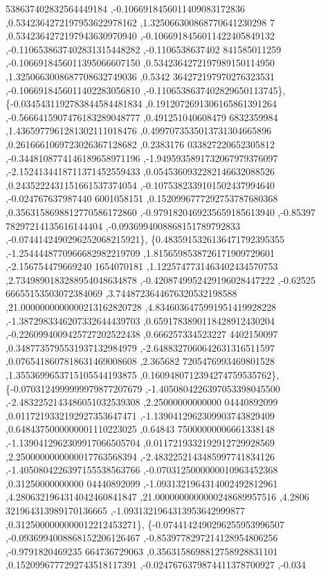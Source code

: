 \begin{DoxyCode}
      538637402832564449184 ,-0.1066918456011409083172836 ,0.5342364272197953622978162 ,1.325066300868770641230298
      7 ,0.5342364272197943630970940 ,-0.1066918456011422405849132 ,-0.1106538637402831315448282 ,-0.1106538637402
      841585011259 ,-0.1066918456011395066607150 ,0.5342364272197989150114950 ,1.3250663008687708632749036 ,0.5342
      364272197970276323531 ,-0.1066918456011402283056810 ,-0.1106538637402829650113745\},
\{-0.0345431192783844584481834 ,0.1912072691306165861391264 ,-0.5666415907476183289048777 ,0.491251040608479
      6832359984 ,1.4365977961281302111018476 ,0.4997073535013731304665896 ,0.2616661069723026367128682 ,0.2383176
      033827220652305812 ,-0.3448108774146189658971196 ,-1.9495935891732067979376097 ,-2.1524134418711371452559433
       ,0.0545360932282146632088526 ,0.2435222431151661537374054 ,-0.1075382339101502437994640 ,-0.024767637987440
      6001058151 ,0.1520996777292753787680368 ,0.3563158698812770586172860 ,-0.9791820469235659185613940 ,-0.85397
      78297214135616144404 ,-0.0936994008868151789792833 ,-0.0744142490296252068215921\},
\{0.4835915326136471792395355 ,-1.2544448770966682982219709 ,1.8156598538726171909729601 ,-2.156754479669240
      1654070181 ,1.1225747731463402434570753 ,2.7349890183288954048634878 ,-0.4208749952429196028447222 ,-0.62525
      66655153503072384069 ,3.7448723644676320532198588 ,21.0000000000000213162820728 ,4.8346036475991951419928228
       ,-1.3872983346207332644439703 ,0.6591783890118428912430204 ,-0.2260994009425727202522438 ,0.666257334523227
      4402150097 ,0.3487735795531937132984979 ,-2.6488327060642631316511597 ,0.0765418607818631469008608 ,2.365682
      7205476993469801528 ,1.3553699653715105544193875 ,0.1609480712394274759535762\},
\{-0.0703124999999979877207679 ,-1.4050804226397053398045500 ,-2.4832252143486051032539308 ,2.25000000000000
      04440892099 ,0.0117219332192927353647471 ,-1.1390412962309903743829409 ,0.6484375000000001110223025 ,0.64843
      75000000006661338148 ,-1.1390412962309917066505704 ,0.0117219332192912729928569 ,2.2500000000000017763568394
       ,-2.4832252143485997741834126 ,-1.4050804226397155538563766 ,-0.0703125000000010963452368 ,0.31250000000000
      04440892099 ,-1.0931321964314002492812961 ,4.2806321964314042460841847 ,21.0000000000000248689957516 ,4.2806
      321964313989170136665 ,-1.0931321964313953642999877 ,0.3125000000000012212453271\},
\{-0.0744142490296255953996507 ,-0.0936994008868152206126467 ,-0.8539778297214128954806256 ,-0.9791820469235
      664736729063 ,0.3563158698812758928831101 ,0.1520996777292743518117391 ,-0.0247676379874411378700927 ,-0.034

\end{DoxyCode}
